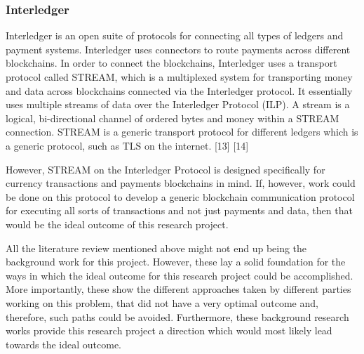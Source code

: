 \documentclass[a4paper,twoside,phd]{BYUPhys}
\begin{document}
\subsubsection{Interledger}
Interledger is an open suite of protocols for connecting all types of ledgers and payment systems. Interledger uses connectors to route payments across different blockchains. In order to connect the blockchains, Interledger uses a transport protocol called STREAM, which is a multiplexed system for transporting money and data across blockchains connected via the Interledger protocol. It essentially uses multiple streams of data over the Interledger Protocol (ILP). A stream is a logical, bi-directional channel of ordered bytes and money within a STREAM connection. STREAM is a generic transport protocol for different ledgers which is a generic protocol, such as TLS on the internet. [13] [14] \par
However, STREAM on the Interledger Protocol is designed specifically for currency transactions and payments blockchains in mind. If, however, work could be done on this protocol to develop a generic blockchain communication protocol for executing all sorts of transactions and not just payments and data, then that would be the ideal outcome of this research project. \par
All the literature review mentioned above might not end up being the background work for this project. However, these lay a solid foundation for the ways in which the ideal outcome for this research project could be accomplished. More importantly, these show the different approaches taken by different parties working on this problem, that did not have a very optimal outcome and, therefore, such paths could be avoided. Furthermore, these background research works provide this research project a direction which would most likely lead towards the ideal outcome.
\end{document}
